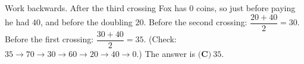 Work backwards. After the third crossing Fox has $0$ coins, so just before paying he had $40$, and before the doubling $20$. Before the second crossing: $\dfrac{20+40}{2}=30$. Before the first crossing: $\dfrac{30+40}{2}=35$. (Check: $35\to70\to30\to60\to20\to40\to0$.) The answer is $\boxed{\textbf{(C)}\ 35}$.
